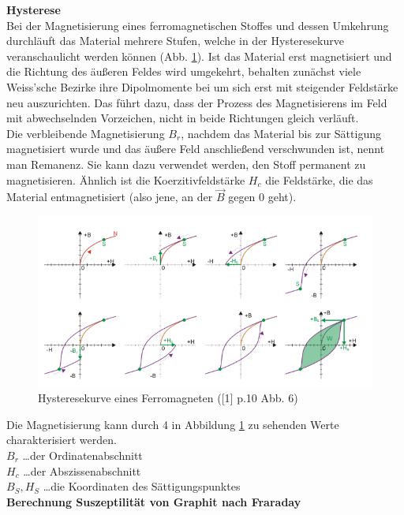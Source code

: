 \documentclass[12pt,a4paper]{article}
\begin{document}
\begin{multicols}{2}
\noindent \textbf{Hysterese}\\
Bei der Magnetisierung eines ferromagnetischen Stoffes und dessen Umkehrung durchläuft das Material mehrere Stufen, welche in der Hysteresekurve veranschaulicht werden können (Abb. \ref{fig:hysterese}). Ist das Material erst magnetisiert und die Richtung des äußeren Feldes wird umgekehrt, behalten zunächst viele Weiss'sche Bezirke ihre Dipolmomente bei um sich erst mit steigender Feldstärke neu auszurichten. Das führt dazu, dass der Prozess des Magnetisierens im Feld mit abwechselnden Vorzeichen, nicht in beide Richtungen gleich verläuft.\\
Die verbleibende Magnetisierung $B_r$, nachdem das Material bis zur Sättigung magnetisiert wurde und das äußere Feld anschließend verschwunden ist, nennt man Remanenz. Sie kann dazu verwendet werden, den Stoff permanent zu magnetisieren. Ähnlich ist die Koerzitivfeldstärke $H_c$ die Feldstärke, die das Material entmagnetisiert (also jene, an der $\vec B$ gegen 0 geht).

\begin{figure}[H]
	\centering
	\includegraphics[scale=0.3]{./figures/hysterese.png}
	\caption{Hysteresekurve eines Ferromagneten ([1] p.10 Abb. 6)}
	\label{fig:hysterese}
\end{figure}

\noindent
Die Magnetisierung kann durch 4 in Abbildung \ref{fig:hysterese} zu sehenden Werte charakterisiert werden.\\
$B_r$ \ldots der Ordinatenabschnitt\\
$H_c$ \ldots der Abszissenabschnitt\\
$B_S, H_S$ \ldots die Koordinaten des Sättigungspunktes\\


\textbf{Berechnung Suszeptilität von Graphit nach Fraraday}


\end{multicols}
\end{document}
